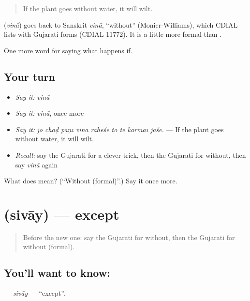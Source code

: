 \begin{quote}
If the plant goes without water, it will wilt.
\end{quote}

\begin{cousinweb}
\textbf{} (\emph{vinā}) goes back to Sanskrit \emph{vínā}, \textquotedblleft{}without\textquotedblright{} (Monier-Williams), which CDIAL lists with Gujarati forms (CDIAL 11772). It is a little more formal than \textbf{}.
\end{cousinweb}

\begin{grammarlens}[title={What you've built}]
One more word for saying what happens if.
\end{grammarlens}

\subsection*{Your turn}
\begin{itemize}
\raggedright
  \item \emph{Say it:} \emph{vinā}
  \item \emph{Say it:} \emph{vinā}, once more
  \item \emph{Say it:} \emph{jo choḍ pāṇī vinā raheśe to te karmāī jaśe.} — If the plant goes without water, it will wilt.
  \item \emph{Recall:} say the Gujarati for a clever trick, then the Gujarati for without, then say \emph{vinā} again
\end{itemize}

\begin{tcolorbox}[breakable,colback=teal!4,colframe=teal!35!black,title={Before you move on}]
What does  mean? (\textquotedblleft{}Without (formal)\textquotedblright{}.) Say it once more.
\end{tcolorbox}
\section[\texorpdfstring{\gu{સિવાય} (sivāy)}{સિવાય (sivāy)}]{ (sivāy) — except}

\label{lesson:GU-C546-sivay}



\begin{quote}
Before the new one: say the Gujarati for without, then the Gujarati for without (formal).
\end{quote}

\subsection*{You'll want to know: }
\textbf{} — \emph{sivāy} — \textquotedblleft{}except\textquotedblright{}.

